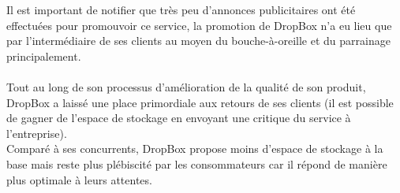 \documentclass[a4paper, 10pt]{article}
\begin{document}
Il est important de notifier que tr\`es peu d'annonces publicitaires ont \'et\'e effectu\'ees pour promouvoir ce service,
la promotion de DropBox n'a eu lieu que par l'interm\'ediaire de ses clients au moyen du bouche-\`a-oreille et du parrainage principalement.\\ \\
Tout au long de son processus d'am\'elioration de la qualit\'e de son produit, DropBox a laiss\'e une place primordiale aux retours de ses clients
(il est possible de gagner de l'espace de stockage en envoyant une critique du service \`a l'entreprise).\\
Compar\'e \`a ses concurrents, DropBox propose moins d'espace de stockage \`a la base mais reste plus pl\'ebiscit\'e par les consommateurs
car il r\'epond de mani\`ere plus optimale \`a leurs attentes.\\ \\
\end{document}
